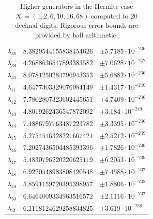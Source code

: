 \documentclass[a4paper,10pt]{article}
\begin{document}
\begin{appendix}
\begin{table}
\begin{tabular}{|l|ll|}
  $\lambda_{38}$ & $8.3829544155838454626$  & $\pm 5.7185 \cdot 10^{-236}$ \\
  $\lambda_{39}$ & $4.2688636547893383582$  & $\pm 7.0628 \cdot 10^{-242}$ \\
  $\lambda_{40}$ & $8.0781250284796943353$  & $\pm 5.6882 \cdot 10^{-236}$ \\
  $\lambda_{41}$ & $4.6477303329076984149$  & $\pm 1.4317 \cdot 10^{-240}$ \\
  $\lambda_{42}$ & $7.7802807323602445651$  & $\pm 4.7409 \cdot 10^{-236}$ \\
  $\lambda_{43}$ & $4.8019262436547872092$  & $\pm 3.184 \cdot 10^{-240}$ \\
  $\lambda_{44}$ & $7.4886797763487223782$  & $\pm 3.3395 \cdot 10^{-236}$ \\
  $\lambda_{45}$ & $5.2754516328221667421$  & $\pm 2.5212 \cdot 10^{-239}$ \\
  $\lambda_{46}$ & $7.2027436504485393396$  & $\pm 1.7826 \cdot 10^{-236}$ \\
  $\lambda_{47}$ & $5.4830796220220625119$  & $\pm 6.2053 \cdot 10^{-239}$ \\
  $\lambda_{48}$ & $6.9220548983808420548$  & $\pm 7.4588 \cdot 10^{-237}$ \\
  $\lambda_{49}$ & $5.8591159720395398957$  & $\pm 1.8806 \cdot 10^{-238}$ \\
  $\lambda_{50}$ & $6.6464009334963516572$  & $\pm 2.1116 \cdot 10^{-237}$ \\
  $\lambda_{51}$ & $6.1118124629258834825$  & $\pm 3.619 \cdot 10^{-238}$ \\
  \hline
  \end{tabular}
  \caption{Higher generators in the Hermite case $\mathcal{K} = (1, 2, 6, 10, 16, 68)$
  computed to 20 decimal digits. Rigorous error bounds are provided by ball
  arithmetic.}
\end{table}

\end{appendix}




\end{document}
